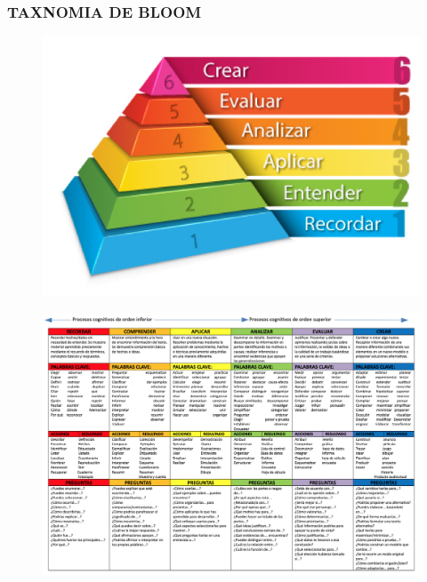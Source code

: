 \documentclass[
	11pt, %
]{beamer}
\begin{document}
\begin{frame}
  \frametitle{TAXNOMIA DE BLOOM}
  \begin{figure}[h]
    \includegraphics[width=0.7\linewidth]{taxonomia_de_bloom.png}
  \end{figure}
\end{frame}

\begin{frame}
  \begin{figure}[h]
    \includegraphics[width=1.0\linewidth]{bloom.png}
  \end{figure}
\end{frame}
\end{document}

